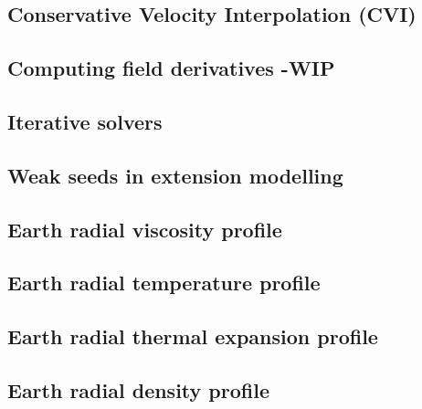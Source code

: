 \subsection{Conservative Velocity Interpolation (CVI)} \label{sec:cvi} %
\newpage %
\subsection{Computing field derivatives -WIP} \label{ss:nodderiv}  %
\newpage %
\subsection{Iterative solvers \label{ss:itsolvers}}  %
\newpage %
\subsection{Weak seeds in extension modelling \label{ss:weakseeds}}  %
\newpage %
\subsection{Earth radial viscosity profile \label{ss:viscprof}}  %
\newpage %
\subsection{Earth radial temperature profile \label{ss:adiab}}  %
\newpage %
\subsection{Earth radial thermal expansion profile}  %
\newpage %
\subsection{Earth radial density profile}  %
\newpage %
